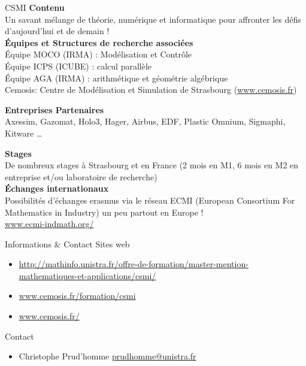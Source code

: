 \begin{frame}[allowframebreaks]{CSMI}
  \textbf{Contenu}\\
  Un savant mélange de théorie, numérique et informatique pour
  affronter les défis d'aujourd'hui et de demain !\\

  \textbf{Équipes et Structures de recherche associées}\\
  Équipe MOCO (IRMA) : Modélisation et Contrôle\\
  Équipe ICPS (ICUBE) : calcul parallèle\\
  Équipe AGA (IRMA) : arithmétique et géométrie algébrique\\
  Cemosis: Centre de Modélisation et Simulation de Strasbourg (\url{www.cemosis.fr})\\
  
  \framebreak

  \textbf{Entreprises Partenaires}\\
  Axessim, Gazomat, Holo3, Hager, Airbus, EDF, Plastic Omnium,
  Sigmaphi, Kitware \ldots

  \textbf{Stages}\\
  De nombreux stages à Strasbourg et en France (2 mois en M1, 6 mois
  en M2 en entreprise et/ou laboratoire de recherche)\\

\textbf{Échanges internationaux}\\
Possibilités d'échanges erasmus via le réseau ECMI (European
Consortium For Mathematics in Industry) un peu partout en Europe !\\
\url{www.ecmi-indmath.org/}
\end{frame}

\begin{frame}{Informations \& Contact}
  Sites web
  \begin{itemize}
  \item \url{http://mathinfo.unistra.fr/offre-de-formation/master-mention-mathematiques-et-applications/csmi/}
  \item \url{www.cemosis.fr/formation/csmi}
  \item \url{www.cemosis.fr/}
  \end{itemize}
  Contact
  \begin{itemize}
  \item Christophe Prud'homme \url{prudhomme@unistra.fr}
  \end{itemize}
\end{frame}
